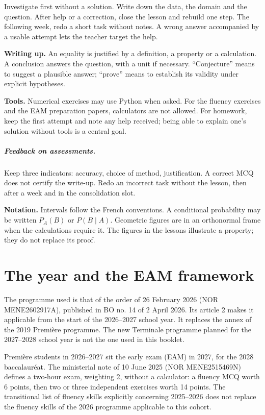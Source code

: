 \begin{keypoint}
Investigate first without a solution. Write down the data, the domain and the question. After help or a correction, close the lesson and rebuild one step. The following week, redo a short task without notes. A wrong answer accompanied by a usable attempt lets the teacher target the help.
\end{keypoint}

\textbf{Writing up.} An equality is justified by a definition, a property or a calculation. A conclusion answers the question, with a unit if necessary. ``Conjecture'' means to suggest a plausible answer; ``prove'' means to establish its validity under explicit hypotheses.

\textbf{Tools.} Numerical exercises may use Python when asked. For the fluency exercises and the EAM preparation papers, calculators are not allowed. For homework, keep the first attempt and note any help received; being able to explain one's solution without tools is a central goal.

\ifmxteacher\paragraph{Feedback on assessments.} Keep three indicators: accuracy, choice of method, justification. A correct MCQ does not certify the write-up. Redo an incorrect task without the lesson, then after a week and in the consolidation slot.\fi

\textbf{Notation.} Intervals follow the French conventions. A conditional probability may be written $P_A(B)$ or $P(B\mid A)$. Geometric figures are in an orthonormal frame when the calculations require it. The figures in the lessons illustrate a property; they do not replace its proof.

\chapter*{The year and the EAM framework}
The programme used is that of the order of 26 February 2026 (NOR MENE2602917A), published in BO no. 14 of 2 April 2026. Its article 2 makes it applicable from the start of the 2026--2027 school year. It replaces the annex of the 2019 Première programme. The new Terminale programme planned for the 2027--2028 school year is not the one used in this booklet.

Première students in 2026--2027 sit the early exam (EAM) in 2027, for the 2028 baccalauréat. The ministerial note of 10 June 2025 (NOR MENE2515469N) defines a two-hour exam, weighting 2, without a calculator: a fluency MCQ worth 6 points, then two or three independent exercises worth 14 points. The transitional list of fluency skills explicitly concerning 2025--2026 does not replace the fluency skills of the 2026 programme applicable to this cohort.


